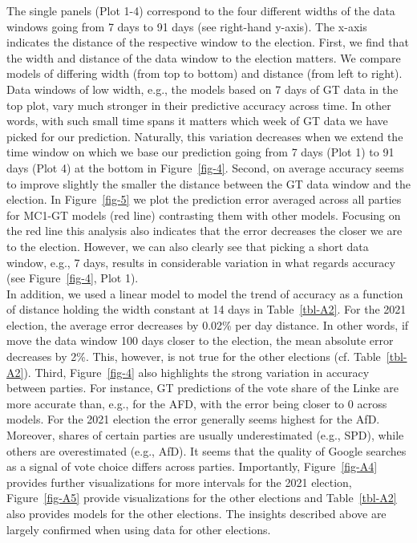 \documentclass[
  letterpaper,
  DIV=11,
  numbers=noendperiod]{scrartcl}
\begin{document}
The single panels (Plot 1-4) correspond to the four different widths of
the data windows going from 7 days to 91 days (see right-hand y-axis).
The x-axis indicates the distance of the respective window to the
election. First, we find that the width and distance of the data window
to the election matters. We compare models of differing width (from top
to bottom) and distance (from left to right). Data windows of low width,
e.g., the models based on 7 days of GT data in the top plot, vary much
stronger in their predictive accuracy across time. In other words, with
such small time spans it matters which week of GT data we have picked
for our prediction. Naturally, this variation decreases when we extend
the time window on which we base our prediction going from 7 days (Plot
1) to 91 days (Plot 4) at the bottom in Figure~\ref{fig-4}. Second, on
average accuracy seems to improve slightly the smaller the distance
between the GT data window and the election. In Figure~\ref{fig-5} we
plot the prediction error averaged across all parties for MC1-GT models
(red line) contrasting them with other models. Focusing on the red line
this analysis also indicates that the error decreases the closer we are
to the election. However, we can also clearly see that picking a short
data window, e.g., 7 days, results in considerable variation in what
regards accuracy (see Figure~\ref{fig-4}, Plot 1).\\
In addition, we used a linear model to model the trend of accuracy as a
function of distance holding the width constant at 14 days in
Table~\ref{tbl-A2}. For the 2021 election, the average error decreases
by 0.02\% per day distance. In other words, if move the data window 100
days closer to the election, the mean absolute error decreases by 2\%.
This, however, is not true for the other elections (cf.
Table~\ref{tbl-A2}). Third, Figure~\ref{fig-4} also highlights the
strong variation in accuracy between parties. For instance, GT
predictions of the vote share of the Linke are more accurate than, e.g.,
for the AFD, with the error being closer to 0 across models. For the
2021 election the error generally seems highest for the AfD. Moreover,
shares of certain parties are usually underestimated (e.g., SPD), while
others are overestimated (e.g., AfD). It seems that the quality of
Google searches as a signal of vote choice differs across parties.
Importantly, Figure~\ref{fig-A4} provides further visualizations for
more intervals for the 2021 election, Figure~\ref{fig-A5} provide
visualizations for the other elections and Table~\ref{tbl-A2} also
provides models for the other elections. The insights described above
are largely confirmed when using data for other elections.
\end{document}
